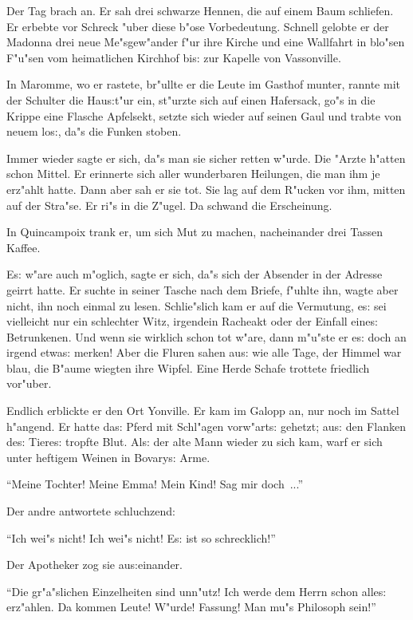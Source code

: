 \documentclass[oneside,12pt]{book}
\newcommand{\s}{s:}%
\begin{document}
Der Tag brach an. Er sah drei schwarze Hennen, die auf einem Baum
schliefen. Er erbebte vor Schreck "uber diese b"ose Vorbedeutung.
Schnell gelobte er der Madonna drei neue Me"sgew"ander f"ur ihre
Kirche und eine Wallfahrt in blo"sen F"u"sen vom heimatlichen
Kirchhof bi{\s} zur Kapelle von Vassonville.

In Maromme, wo er rastete, br"ullte er die Leute im Gasthof
munter, rannte mit der Schulter die Hau{\s}t"ur ein, st"urzte sich
auf einen Hafersack, go"s in die Krippe eine Flasche Apfelsekt,
setzte sich wieder auf seinen Gaul und trabte von neuem lo{\s},
da"s die Funken stoben.

Immer wieder sagte er sich, da"s man sie sicher retten w"urde. Die
"Arzte h"atten schon Mittel. Er erinnerte sich aller wunderbaren
Heilungen, die man ihm je erz"ahlt hatte. Dann aber sah er sie
tot. Sie lag auf dem R"ucken vor ihm, mitten auf der Stra"se. Er
ri"s in die Z"ugel. Da schwand die Erscheinung.

In Quincampoix trank er, um sich Mut zu machen, nacheinander drei
Tassen Kaffee.

E{\s} w"are auch m"oglich, sagte er sich, da"s sich der Absender
in der Adresse geirrt hatte. Er suchte in seiner Tasche nach dem
Briefe, f"uhlte ihn, wagte aber nicht, ihn noch einmal zu lesen.
Schlie"slich kam er auf die Vermutung, e{\s} sei vielleicht nur
ein schlechter Witz, irgendein Racheakt oder der Einfall eine{\s}
Betrunkenen. Und wenn sie wirklich schon tot w"are, dann m"u"ste
er e{\s} doch an irgend etwa{\s} merken! Aber die Fluren sahen
au{\s} wie alle Tage, der Himmel war blau, die B"aume wiegten ihre
Wipfel. Eine Herde Schafe trottete friedlich vor"uber.

Endlich erblickte er den Ort Yonville. Er kam im Galopp an, nur
noch im Sattel h"angend. Er hatte da{\s} Pferd mit Schl"agen
vorw"art{\s} gehetzt; au{\s} den Flanken de{\s} Tiere{\s} tropfte
Blut. Al{\s} der alte Mann wieder zu sich kam, warf er sich unter
heftigem Weinen in Bovary{\s} Arme.

"`Meine Tochter! Meine Emma! Mein Kind! Sag mir doch~..."'

Der andre antwortete schluchzend:

"`Ich wei"s nicht! Ich wei"s nicht! E{\s} ist so schrecklich!"'

Der Apotheker zog sie au{\s}einander.

"`Die gr"a"slichen Einzelheiten sind unn"utz! Ich werde dem Herrn
schon alle{\s} erz"ahlen. Da kommen Leute! W"urde! Fassung! Man
mu"s Philosoph sein!"'
\end{document}
